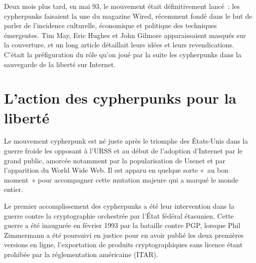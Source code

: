 Deux mois plus tard, en mai 93, le mouvement était définitivement lancé~: les cypherpunks faisaient la une du magazine Wired, récemment fondé dans le but de parler de l'incidence culturelle, économique et politique des techniques émergentes. Tim May, Eric Hughes et John Gilmore apparaissaient masqués sur la couverture, et un long article détaillait leurs idées et leurs revendications. C'était la préfiguration du rôle qu'on joué par la suite les cypherpunks dans la sauvegarde de la liberté sur Internet. %

\section*{L'action des cypherpunks pour la liberté} %

Le mouvement cypherpunk est né juste après le triomphe des États-Unis dans la guerre froide les opposant à l'URSS et au début de l'adoption d'Internet par le grand public, amorcée notamment par la popularisation de Usenet et par l'apparition du World Wide Web. Il est apparu en quelque sorte «~au bon moment~» pour accompagner cette mutation majeure qui a marqué le monde entier.


Le premier accomplissement des cypherpunks a été leur intervention dans la guerre contre la cryptographie orchestrée par l'État fédéral étasunien. Cette guerre a été inaugurée en février 1993 par la bataille contre PGP, lorsque Phil Zimmermann a été poursuivi en justice pour en avoir publié les deux premières versions en ligne, l'exportation de produits cryptographiques sans licence étant prohibée par la réglementation américaine (ITAR).

%

